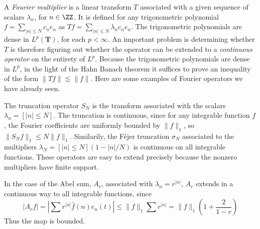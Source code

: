 A \emph{Fourier multiplier} is a linear transform $T$ associated with a given sequence of scalars $\lambda_n$, for $n \in \ZZ$. It is defined for any trigonometric polynomial $f = \sum_{|n| \leq N} c_n e_n$ as $Tf = \sum_{|n| \leq N} \lambda_n c_n e_n$. The trigonometric polynomials are dense in $L^p(\mathbf{T})$, for each $p < \infty$. An important problem is determining whether $T$ is therefore figuring out whether the operator can be extended to a {\it continuous operator} on the entirety of $L^p$. Because the trigonometric polynomials are dense in $L^p$, in the light of the Hahn Banach theorem it suffices to prove an inequality of the form $\| Tf \| \lesssim \| f \|$. Here are some examples of Fourier operators we have already seen.

\begin{example}
    The truncation operator $S_N$ is the transform associated with the scalars $\lambda_n = [|n| \leq N]$. The truncation is continuous, since for any integrable function $f$, the Fourier coefficients are uniformly bounded by $\| f \|_1$, so $\| S_N f \|_1 \leq N \| f \|_1$. Similarily, the F\'{e}jer truncation $\sigma_N$ associated to the multipliers $\lambda_N = [|n| \leq N](1 - |n|/N)$ is continuous on all integrable functions. These operators are easy to extend precisely because the nonzero multipliers have finite support.
\end{example}

\begin{example}
    In the case of the Abel sum, $A_r$, associated with $\lambda_n = r^{|n|}$, $A_r$ extends in a continuous way to all integrable functions, since
    \[ |A_r f| = \left| \sum r^{|n|} \widehat{f}(n) e_n(t) \right| \leq \| f \|_1 \sum r^{|n|} = \| f \|_1 \left( 1 + \frac{2}{1 - r} \right) \]
    Thus the map is bounded.
\end{example}

